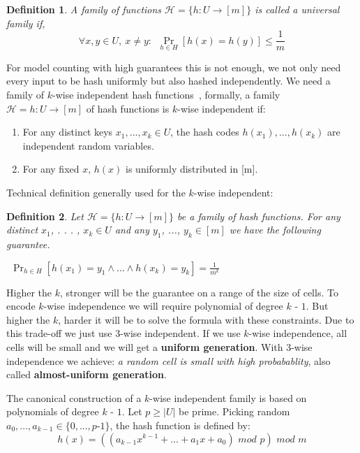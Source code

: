 \documentclass{article}
\newtheorem{definition}{Definition}
\begin{document}
\begin{definition}
A family of functions $\mathcal{H}=\{h: U \to [m]\}$  is called a universal family if, 
\[ \forall x,y\in U,~x\neq y:~~\Pr _{h\in H}[h(x)=h(y)]\leq {\frac {1}{m}} \]	
\end{definition}

For model counting with high guarantees this is not enough, we not only need every input to be hash uniformly but also hashed independently. We need a family of $k$-wise independent hash functions~\cite{DBLP:conf/focs/WegmanC79},
%
formally, 
a family $\mathcal{H} = {h : U \to [m]}$ of hash functions
is $k$-wise independent if:
\begin{enumerate}
	\item For any distinct keys $x_1, ..., x_k \in U$, the hash codes
	$h(x_1), ..., h(x_k)$ are independent random variables.
	\item For any fixed $x$, $h(x)$ is uniformly distributed in [m].
\end{enumerate}

Technical definition generally used for the $k$-wise independent:
\begin{definition}
	Let $\mathcal{H}=\{h: U \to [m]\}$ be a family of hash functions. For any distinct $x_1$, . . . , $x_k \in U$ and any $y_1$, ..., $y_k \in [m]$ we have the following guarantee.
	
	$~~\Pr_{h\in H}
	[h(x_1) = y_1 \land ... \land h(x_k) = y_k] = \frac {1}
	{m^
		k}$
\end{definition}

Higher the $k$, stronger will be the guarantee on a range of the size of cells. To encode $k$-wise independence we will require polynomial of degree $k$ - $1$. But higher the $k$, harder it will be to solve the formula with these constraints. Due to this trade-off we just use 3-wise independent. If we use $k$-wise independence, all cells will be  small and we will get a \textbf{uniform generation}. With $3$-wise independence we achieve: \emph{a random cell is small with high probabablity}, also called \textbf{almost-uniform generation}.


The canonical construction of a $k$-wise independent family is based on polynomials
of degree $k$ - $1$. Let $p \geq |U|$ be prime. Picking random $a_0,...,a_{k - 1} \in \{0, . . . , p$-$ 1\}$,
the hash function is defined by:
\[ h(x) = ( ( a_{k-1} x^ {k - 1} + ... + a_1 x + a_0) \,\, mod \,\, p) \,\, mod \,\,  m\]
\end{document}
